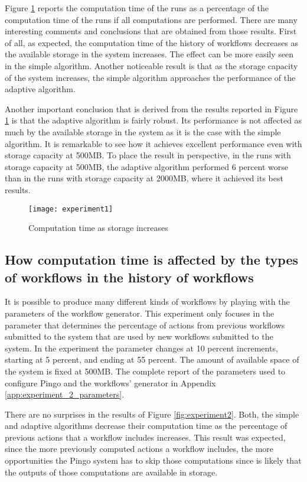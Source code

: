Figure \ref{fig:experiment1} reports the computation time of the runs as a percentage of the computation time of the runs if all computations are performed. There are many interesting comments and conclusions that are obtained from those results. First of all, as expected, the computation time of the history of workflows decreases as the available storage in the system increases.  The effect can be more easily seen in the simple algorithm.  Another noticeable result is that as the storage capacity of the system increases, the simple algorithm approaches the performance of the adaptive algorithm.

Another important conclusion that is derived from the results reported in Figure \ref{fig:experiment1} is that the adaptive algorithm is fairly robust. Its performance is not affected as much by the available storage in the system as it is the case with the simple algorithm. It is remarkable to see how it achieves excellent performance even with storage capacity at 500MB.  To place the result in perspective, in the runs with storage capacity at 500MB, the adaptive algorithm performed 6 percent worse than in the runs with storage capacity at 2000MB, where it achieved its best results.


\begin{figure}
\centering
\texttt{[image: experiment1]}
\caption{Computation time as storage increases}
\label{fig:experiment1}
\end{figure}

\subsection{How computation time is affected by the types of workflows in the history of workflows}
It is possible to produce many different kinds of workflows by playing with the parameters of the workflow generator.  This experiment only focuses in the parameter that determines the percentage of actions from previous workflows submitted to the system that are used by new workflows submitted to the system.  In the experiment the parameter changes at 10 percent increments, starting at 5 percent, and ending at 55 percent.  The amount of available space of the system is fixed at 500MB.   The complete report of the parameters used to configure Pingo and the workflows' generator in Appendix \ref{app:experiment_2_parameters}.

There are no surprises in the results of Figure \ref{fig:experiment2}.  Both, the simple and adaptive algorithms decrease their computation time as the percentage of previous actions that a workflow includes increases.  This result was expected, since the more previously computed actions a workflow includes, the more opportunities the Pingo system has to skip those computations since is likely that the outputs of those computations are available in storage.

